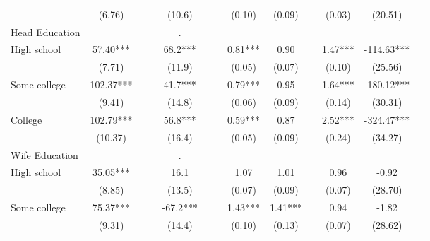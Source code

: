 \begin{landscape}
\begin{center}
\begin{threeparttable}
\begin{footnotesize}
\begin{tabular}{lcccccccccccc}
                     &      (6.76)   &               &&      (10.6)   &               &&     (0.10)   &      (0.09)   &&      (0.03)   &     (20.51)   &               \\
Head Education       &               &               &&           .   &               &&              &               &&               &               &               \\
\;\;\;High school    &       57.40***&               &&        68.2***&               &&       0.81***&        0.90   &&        1.47***&     -114.63***&               \\
                     &      (7.71)   &               &&      (11.9)   &               &&     (0.05)   &      (0.07)   &&      (0.10)   &     (25.56)   &               \\
\;\;\;Some college   &      102.37***&               &&        41.7***&               &&       0.79***&        0.95   &&        1.64***&     -180.12***&               \\
                     &      (9.41)   &               &&      (14.8)   &               &&     (0.06)   &      (0.09)   &&      (0.14)   &     (30.31)   &               \\
\;\;\;College        &      102.79***&               &&        56.8***&               &&       0.59***&        0.87   &&        2.52***&     -324.47***&               \\
                     &     (10.37)   &               &&      (16.4)   &               &&     (0.05)   &      (0.09)   &&      (0.24)   &     (34.27)   &               \\
Wife Education       &               &               &&           .   &               &&              &               &&               &               &               \\
\;\;\;High school    &       35.05***&               &&        16.1   &               &&       1.07   &        1.01   &&        0.96   &       -0.92   &               \\
                     &      (8.85)   &               &&      (13.5)   &               &&     (0.07)   &      (0.09)   &&      (0.07)   &     (28.70)   &               \\
\;\;\;Some college   &       75.37***&               &&       -67.2***&               &&       1.43***&        1.41***&&        0.94   &       -1.82   &               \\
                     &      (9.31)   &               &&      (14.4)   &               &&     (0.10)   &      (0.13)   &&      (0.07)   &     (28.62)   &               \\

\end{tabular}
\end{footnotesize}
\end{threeparttable}
\end{center}
\end{landscape}
